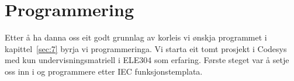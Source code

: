 \chapter{Programmering}
\thispagestyle{fancy}
Etter å ha danna oss eit godt grunnlag av korleis vi ønskja programmet i kapittel~\ref{sec:7} 
byrja vi programmeringa. \newline
Vi starta eit tomt prosjekt i \gls{Codesys} med kun undervisningsmatriell i ELE304 som erfaring. \citep{Olav} \citep{Olav2} \newline
Første steget var å setje oss inn i og programmere etter \gls{IEC} funksjonstemplata.


